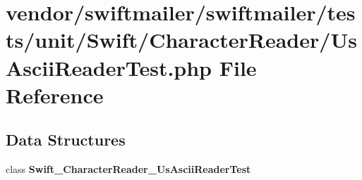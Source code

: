 \section{vendor/swiftmailer/swiftmailer/tests/unit/\+Swift/\+Character\+Reader/\+Us\+Ascii\+Reader\+Test.php File Reference}
\label{_us_ascii_reader_test_8php}
\subsection*{Data Structures}
\begin{DoxyCompactItemize}
\item 
class {\bf Swift\+\_\+\+Character\+Reader\+\_\+\+Us\+Ascii\+Reader\+Test}
\end{DoxyCompactItemize}
